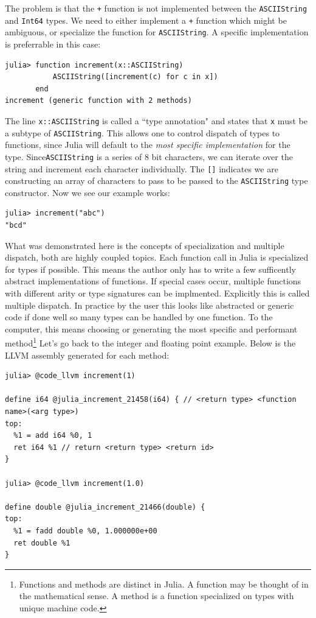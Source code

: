 The problem is that the \texttt{+} function is not implemented between the
\texttt{ASCIIString} and \texttt{Int64} types.
We need to either implement a \texttt{+} function
which might be ambiguous, or specialize the function for \texttt{ASCIIString}.
A specific implementation is preferrable in this case:
\begin{lstlisting}
julia> function increment(x::ASCIIString)
           ASCIIString([increment(c) for c in x])
       end
increment (generic function with 2 methods)
\end{lstlisting}
The line \texttt{x::ASCIIString} is called a ``type annotation" and
states that \texttt{x} must be a subtype
of \texttt{ASCIIString}. This allows one to control dispatch of types to
functions,
since Julia will default to the \emph{most specific implementation}
for the type.
Since\texttt{ASCIIString} is a series of 8 bit characters, we can iterate over the
string and increment each character individually. The \texttt{[]} indicates we are
constructing an array of characters to pass to be passed to the \texttt{ASCIIString}
type constructor. Now we see our example works:
\begin{lstlisting}
julia> increment("abc")
"bcd"
\end{lstlisting}

What was demonstrated here is the concepts of specialization and multiple
dispatch, both are highly coupled topics.
Each function call in Julia is specialized for types if possible.
This means the author only has to write a few sufficently abstract
implementations of functions. If special cases occur, multiple functions
with different arity or type signatures can be implmented. Explicitly
this is called multiple dispatch. In practice by the user this looks like
abstracted or generic code if done well so many types can be handled
by one function.
To the computer, this means choosing or generating the most specific and
performant method\footnote{Functions and methods are distinct in Julia. A
function may be thought of in the mathematical sense. A method is a
function specialized on types with unique machine code.}
Let's go back to the integer and floating point
example. Below is the LLVM assembly generated for each method:
\begin{lstlisting}
julia> @code_llvm increment(1)

define i64 @julia_increment_21458(i64) { // <return type> <function name>(<arg type>)
top:
  %1 = add i64 %0, 1
  ret i64 %1 // return <return type> <return id>
}

julia> @code_llvm increment(1.0)

define double @julia_increment_21466(double) {
top:
  %1 = fadd double %0, 1.000000e+00
  ret double %1
}
\end{lstlisting}

